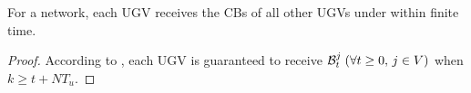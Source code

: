 
	\begin{cor}\label{cor1}
		For a {\fc} network, each UGV receives the CBs of all other UGVs under {\proto} within finite time. 
	\end{cor}
	\begin{proof}
		According to ,
		each UGV is guaranteed to receive $\mathcal{B}^j_t\; (\forall t\ge 0,\, j\in V)$ when \small$k\geq t+NT_u$\normalsize.
		
	\end{proof}
	
	
	
	
